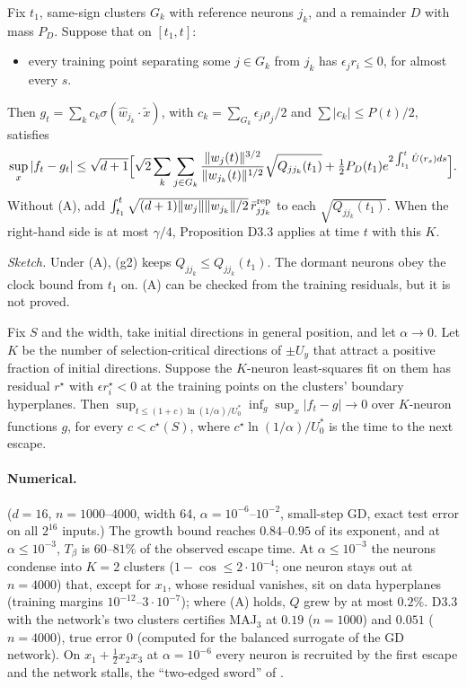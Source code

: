 \begin{proposition}\label{prop:D41}
Fix $t_1$, same-sign clusters $G_k$ with reference neurons $j_k$, and a remainder $D$ with mass $P_D$. Suppose that on $[t_1,t]$:
\begin{itemize}
\item[(A)] every training point separating some $j\in G_k$ from $j_k$ has $\epsilon_jr_i\le0$, for almost every $s$.
\end{itemize}
Then $g_t=\sum_kc_k\sigma(\hat w_{j_k}\cdot\tilde x)$, with $c_k=\sum_{G_k}\epsilon_j\rho_j/2$ and $\sum|c_k|\le P(t)/2$, satisfies
\[
\sup_x|f_t-g_t|\le\sqrt{d+1}\Bigl[\sqrt2\sum_k\sum_{j\in G_k}\frac{\|w_j(t)\|^{3/2}}{\|w_{j_k}(t)\|^{1/2}}\sqrt{Q_{jj_k}(t_1)}+\tfrac12P_D(t_1)e^{2\int_{t_1}^t\hat U(r_s)ds}\Bigr].
\]
Without (A), add $\int_{t_1}^t\sqrt{(d+1)\|w_j\|\|w_{j_k}\|/2}\,\bar r^{\rm rep}_{jj_k}$ to each $\sqrt{Q_{jj_k}(t_1)}$. When the right-hand side is at most $\gamma/4$, Proposition D3.3 applies at time $t$ with this $K$.
\end{proposition}
\noindent\emph{Sketch.} Under (A), (g2) keeps $Q_{jj_k}\le Q_{jj_k}(t_1)$. The dormant neurons obey the clock bound from $t_1$ on. (A) can be checked from the training residuals, but it is not proved.

\begin{conjecture}[Conjecture D4]\label{conj:D4}
Fix $S$ and the width, take initial directions in general position, and let $\alpha\to0$. Let $K$ be the number of selection-critical directions of $\pm U_y$ that attract a positive fraction of initial directions. Suppose the $K$-neuron least-squares fit on them has residual $r^\star$ with $\epsilon r^\star_i<0$ at the training points on the clusters' boundary hyperplanes. Then $\sup_{t\le(1+c)\ln(1/\alpha)/U_0^*}\inf_g\sup_x|f_t-g|\to0$ over $K$-neuron functions $g$, for every $c<c^\star(S)$, where $c^\star\ln(1/\alpha)/U_0^*$ is the time to the next escape.
\end{conjecture}

\paragraph{Numerical.} ($d=16$, $n=1000$--$4000$, width 64, $\alpha=10^{-6}$--$10^{-2}$, small-step GD, exact test error on all $2^{16}$ inputs.) The growth bound reaches $0.84$--$0.95$ of its exponent, and at $\alpha\le10^{-3}$, $T_\beta$ is $60$--$81\%$ of the observed escape time. At $\alpha\le10^{-3}$ the neurons condense into $K=2$ clusters ($1-\cos\le2\cdot10^{-4}$; one neuron stays out at $n=4000$) that, except for $x_1$, whose residual vanishes, sit on data hyperplanes (training margins $10^{-12}$--$3\cdot10^{-7}$); where (A) holds, $Q$ grew by at most $0.2\%$. D3.3 with the network's two clusters certifies MAJ$_3$ at $0.19$ ($n=1000$) and $0.051$ ($n=4000$), true error $0$ (computed for the balanced surrogate of the GD network). On $x_1+\frac12x_2x_3$ at $\alpha=10^{-6}$ every neuron is recruited by the first escape and the network stalls, the ``two-edged sword'' of \cite{boursier2022early}.


